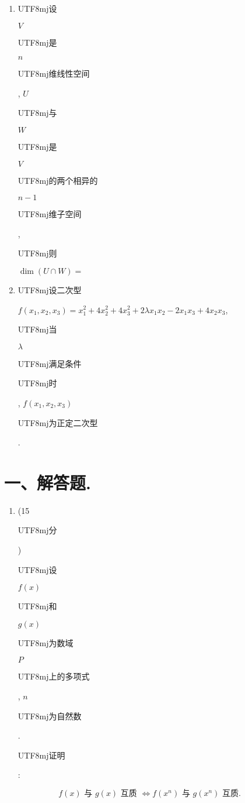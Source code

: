 \documentclass[10pt]{article}
\begin{document}
\begin{enumerate}
  \item \begin{CJK}{UTF8}{mj}设\end{CJK} $V$ \begin{CJK}{UTF8}{mj}是\end{CJK} $n$ \begin{CJK}{UTF8}{mj}维线性空间\end{CJK}, $U$ \begin{CJK}{UTF8}{mj}与\end{CJK} $W$ \begin{CJK}{UTF8}{mj}是\end{CJK} $V$ \begin{CJK}{UTF8}{mj}的两个相异的\end{CJK} $n-1$ \begin{CJK}{UTF8}{mj}维子空间\end{CJK}, \begin{CJK}{UTF8}{mj}则\end{CJK} $\operatorname{dim}(U \cap W)=$

  \item \begin{CJK}{UTF8}{mj}设二次型\end{CJK} $f\left(x_{1}, x_{2}, x_{3}\right)=x_{1}^{2}+4 x_{2}^{2}+4 x_{3}^{2}+2 \lambda x_{1} x_{2}-2 x_{1} x_{3}+4 x_{2} x_{3}$, \begin{CJK}{UTF8}{mj}当\end{CJK} $\lambda$ \begin{CJK}{UTF8}{mj}满足条件\end{CJK} \begin{CJK}{UTF8}{mj}时\end{CJK}, $f\left(x_{1}, x_{2}, x_{3}\right)$ \begin{CJK}{UTF8}{mj}为正定二次型\end{CJK}.

\end{enumerate}
\section{一、解答题.}
\begin{enumerate}
  \item (15 \begin{CJK}{UTF8}{mj}分\end{CJK}) \begin{CJK}{UTF8}{mj}设\end{CJK} $f(x)$ \begin{CJK}{UTF8}{mj}和\end{CJK} $g(x)$ \begin{CJK}{UTF8}{mj}为数域\end{CJK} $P$ \begin{CJK}{UTF8}{mj}上的多项式\end{CJK}, $n$ \begin{CJK}{UTF8}{mj}为自然数\end{CJK}. \begin{CJK}{UTF8}{mj}证明\end{CJK}:
\end{enumerate}
$$
f(x) \text { 与 } g(x) \text { 互质 } \Leftrightarrow f\left(x^{n}\right) \text { 与 } g\left(x^{n}\right) \text { 互质. }
$$
\end{document}
